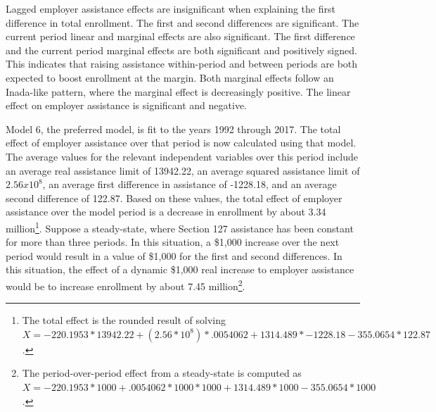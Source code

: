 \documentclass[review]{elsarticle}
\begin{document}
Lagged employer assistance effects are insignificant when explaining the first difference in total enrollment.
The first and second differences are significant.
The current period linear and marginal effects are also significant.
The first difference and the current period marginal effects are both significant and positively signed.
This indicates that raising assistance within-period and between periods are both expected to boost enrollment at the margin.
Both marginal effects follow an Inada-like pattern, where the marginal effect is decreasingly positive.
The linear effect on employer assistance is significant and negative.

Model 6, the preferred model, is fit to the years 1992 through 2017.
The total effect of employer assistance over that period is now calculated using that model.
The average values for the relevant independent variables over this period include
an average real assistance limit of 13942.22,
an average squared assistance limit of $2.56x10^8$,
an average first difference in assistance of -1228.18,
and an average second difference of 122.87.
Based on these values, the total effect of employer assistance over the model period is
a decrease in enrollment by about 3.34 million\footnote{
    The total effect is the rounded result of solving $X=-220.1953*13942.22+(2.56*10^8)*.0054062+1314.489*-1228.18-355.0654*122.87$.
}.
Suppose a steady-state, where Section 127 assistance has been constant for more than three periods.
In this situation, a \$1,000 increase over the next period would result in a value of \$1,000 for the first and second differences.
In this situation, the effect of a dynamic \$1,000 real increase to employer assistance would be
to increase enrollment by about 7.45 million\footnote{
    The period-over-period effect from a steady-state is computed as $X=-220.1953*1000+.0054062*1000*1000+1314.489*1000-355.0654*1000$.
}.
\end{document}
